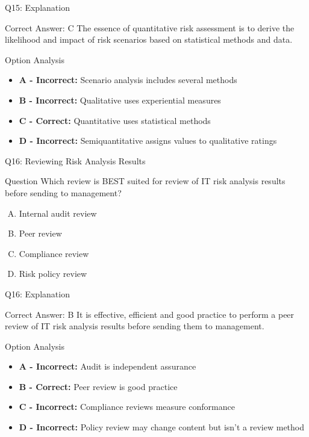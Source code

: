 \documentclass{beamer}
\begin{document}
	\begin{frame}{Q15: Explanation}
		\begin{block}{Correct Answer: C}
			The essence of quantitative risk assessment is to derive the likelihood and impact of risk scenarios based on statistical methods and data.
		\end{block}
		\begin{block}{Option Analysis}
			\begin{itemize}
				\item \textbf{A - Incorrect:} Scenario analysis includes several methods
				\item \textbf{B - Incorrect:} Qualitative uses experiential measures
				\item \textbf{C - Correct:} Quantitative uses statistical methods
				\item \textbf{D - Incorrect:} Semiquantitative assigns values to qualitative ratings
			\end{itemize}
		\end{block}
	\end{frame}
	
	\begin{frame}[shrink=10]{Q16: Reviewing Risk Analysis Results}
		\begin{block}{Question}
			Which review is BEST suited for review of IT risk analysis results before sending to management?
		\end{block}
		\begin{enumerate}[(A)]
			\item Internal audit review
			\item Peer review
			\item Compliance review
			\item Risk policy review
		\end{enumerate}
	\end{frame}
	
	\begin{frame}[shrink=10]{Q16: Explanation}
		\begin{block}{Correct Answer: B}
			It is effective, efficient and good practice to perform a peer review of IT risk analysis results before sending them to management.
		\end{block}
		\begin{block}{Option Analysis}
			\begin{itemize}
				\item \textbf{A - Incorrect:} Audit is independent assurance
				\item \textbf{B - Correct:} Peer review is good practice
				\item \textbf{C - Incorrect:} Compliance reviews measure conformance
				\item \textbf{D - Incorrect:} Policy review may change content but isn't a review method
			\end{itemize}
		\end{block}
		
	\end{frame}
	
\end{document}
